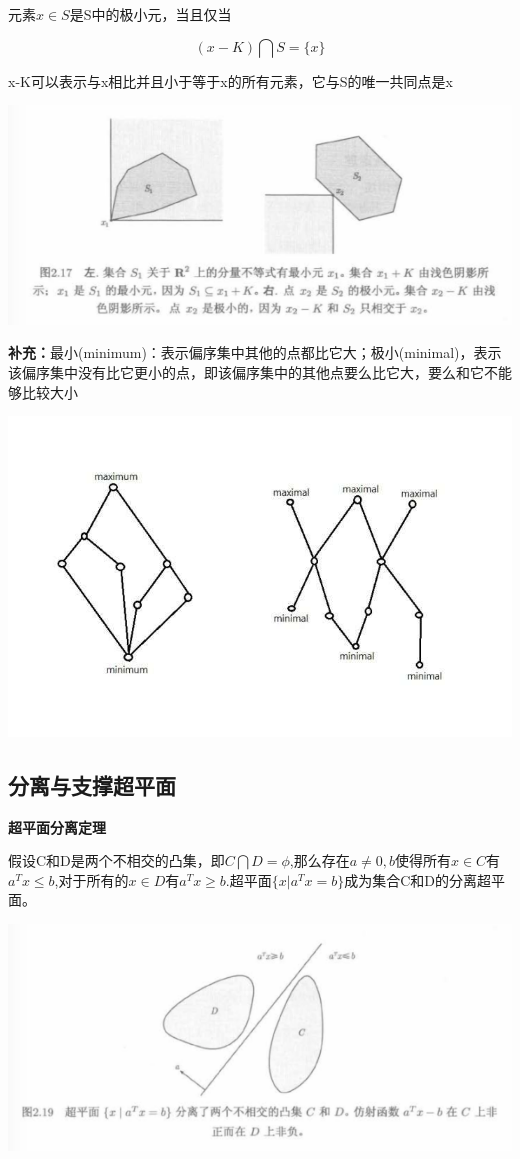 \documentclass{ctexart}
\begin{document}
	元素\(x \in S\)是S中的极小元，当且仅当
	
	\[(x-K) \bigcap S = \{x\}\]
	
	x-K可以表示与x相比并且小于等于x的所有元素，它与S的唯一共同点是x
	
	\includegraphics[width=1\linewidth]{pic/pic2_17}
	
	\textbf{补充：}最小(minimum)：表示偏序集中其他的点都比它大；极小(minimal)，表示该偏序集中没有比它更小的点，即该偏序集中的其他点要么比它大，要么和它不能够比较大小
	
	\includegraphics[width=1\linewidth]{pic/minimum_minimal}
	
	
	\subsection{分离与支撑超平面}
	
	\textbf{超平面分离定理}
	
	假设C和D是两个不相交的凸集，即\(C \bigcap D = \phi\),那么存在\(a \neq 0, b\)使得所有\(x \in C\)有\(a^Tx \leq b\),对于所有的\(x \in D\)有\(a^Tx \geq b\).超平面\(\{x|a^Tx = b\}\)成为集合C和D的分离超平面。
	
	\includegraphics[width=1\linewidth]{pic/pic2_19}
	
\end{document}
